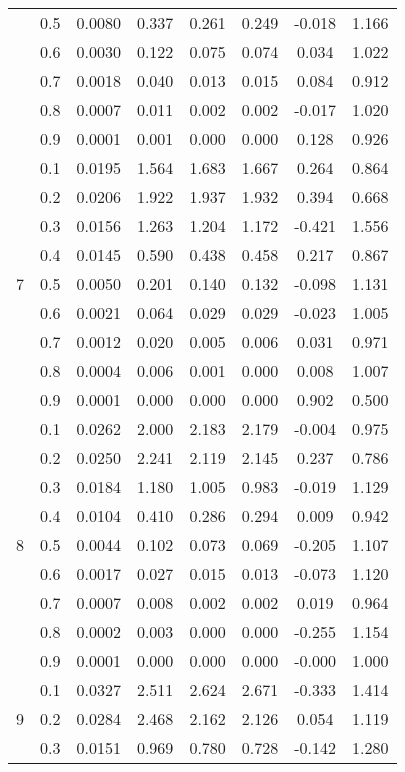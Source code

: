 \documentclass[11pt,a4paper]{report}
\begin{document}
\begin{longtable}{ | c | c || c | c | c | c | c | c | }
 & 0.5 & 0.0080 & 0.337 & 0.261 & 0.249 & -0.018 & 1.166 \\
 & 0.6 & 0.0030 & 0.122 & 0.075 & 0.074 & 0.034 & 1.022 \\
 & 0.7 & 0.0018 & 0.040 & 0.013 & 0.015 & 0.084 & 0.912 \\
 & 0.8 & 0.0007 & 0.011 & 0.002 & 0.002 & -0.017 & 1.020 \\
 & 0.9 & 0.0001 & 0.001 & 0.000 & 0.000 & 0.128 & 0.926 \\
 \hline
\multirow{9}{*}{7} & 0.1 & 0.0195 & 1.564 & 1.683 & 1.667 & 0.264 & 0.864 \\
 & 0.2 & 0.0206 & 1.922 & 1.937 & 1.932 & 0.394 & 0.668 \\
 & 0.3 & 0.0156 & 1.263 & 1.204 & 1.172 & -0.421 & 1.556 \\
 & 0.4 & 0.0145 & 0.590 & 0.438 & 0.458 & 0.217 & 0.867 \\
 & 0.5 & 0.0050 & 0.201 & 0.140 & 0.132 & -0.098 & 1.131 \\
 & 0.6 & 0.0021 & 0.064 & 0.029 & 0.029 & -0.023 & 1.005 \\
 & 0.7 & 0.0012 & 0.020 & 0.005 & 0.006 & 0.031 & 0.971 \\
 & 0.8 & 0.0004 & 0.006 & 0.001 & 0.000 & 0.008 & 1.007 \\
 & 0.9 & 0.0001 & 0.000 & 0.000 & 0.000 & 0.902 & 0.500 \\
 \hline
\multirow{9}{*}{8} & 0.1 & 0.0262 & 2.000 & 2.183 & 2.179 & -0.004 & 0.975 \\
 & 0.2 & 0.0250 & 2.241 & 2.119 & 2.145 & 0.237 & 0.786 \\
 & 0.3 & 0.0184 & 1.180 & 1.005 & 0.983 & -0.019 & 1.129 \\
 & 0.4 & 0.0104 & 0.410 & 0.286 & 0.294 & 0.009 & 0.942 \\
 & 0.5 & 0.0044 & 0.102 & 0.073 & 0.069 & -0.205 & 1.107 \\
 & 0.6 & 0.0017 & 0.027 & 0.015 & 0.013 & -0.073 & 1.120 \\
 & 0.7 & 0.0007 & 0.008 & 0.002 & 0.002 & 0.019 & 0.964 \\
 & 0.8 & 0.0002 & 0.003 & 0.000 & 0.000 & -0.255 & 1.154 \\
 & 0.9 & 0.0001 & 0.000 & 0.000 & 0.000 & -0.000 & 1.000 \\
 \hline
\multirow{9}{*}{9} & 0.1 & 0.0327 & 2.511 & 2.624 & 2.671 & -0.333 & 1.414 \\
 & 0.2 & 0.0284 & 2.468 & 2.162 & 2.126 & 0.054 & 1.119 \\
 & 0.3 & 0.0151 & 0.969 & 0.780 & 0.728 & -0.142 & 1.280 \\

\end{longtable}
\end{document}
